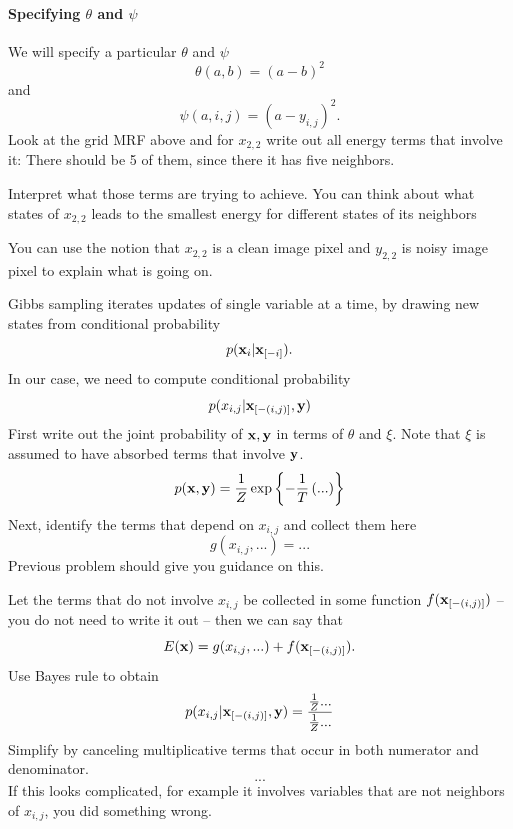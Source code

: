 \documentclass{article}
\begin{document}
\paragraph{Specifying $\theta$ and $\psi$}
We will specify a particular $\theta$ and $\psi$
\[
\theta(a,b) = (a - b)^2
\]
and
\[
\psi(a,i,j) = (a - y_{i,j})^2.
\]
Look at the grid MRF above and for $x_{2,2}$ write out all energy terms that involve it:
\answer
There should be 5 of them, since there it has five neighbors.

Interpret what those terms are trying to achieve. You can think about what states
 of $x_{2,2}$ leads to the smallest energy for different states of its neighbors
 \answer

You can use the notion that $x_{2,2}$ is a clean image pixel and $y_{2,2}$ is noisy image
 pixel to explain what is going on.

\newproblem{2pt}
Gibbs sampling iterates updates of single variable at a time, by drawing new
states from conditional probability
\[
p(\mathbf{x}_{i} | \mathbf{x}_{[-i]}).
\]
In our case, we need to compute conditional probability
\[
p(x_{i,j} | \mathbf{x}_{[-(i,j)]},\mathbf{y})
\]
First write out the joint probability of $\mathbf{x},\mathbf{y}$ in terms of $\theta$ and $\xi$. Note that $\xi$ is
assumed to have absorbed terms that involve $\mathbf{y}$.
\[
p(\mathbf{x},\mathbf{y}) = \frac{1}{Z}\mathop{\rm exp}\left\{-\frac{1}{T}\left( ... \right)\right\}
\]
Next, identify the terms that depend on $x_{i,j}$ and collect them here
\[
g(x_{i,j},...) = ...
\]
Previous problem should give you guidance on this.

Let the terms that do not involve $x_{i,j}$ be collected in some function $f(\mathbf{x}_{[-(i,j)]})$ -- you do not need to write it out -- then
we can say that
\[
E(\mathbf{x}) = g(x_{i,j},...) + f(\mathbf{x}_{[-(i,j)]}).
\]
Use Bayes rule to obtain
\[
p(x_{i,j}| \mathbf{x}_{[-(i,j)]},\mathbf{y}) = \frac{\frac{1}{Z}...}{\frac{1}{Z}...}
\]
Simplify by canceling multiplicative terms that occur in both numerator and denominator.
\[
...
\]
If this looks complicated, for example it involves variables that are not neighbors of $x_{i,j}$, you did something wrong.
\end{document}
